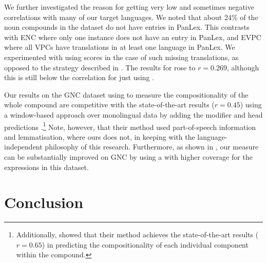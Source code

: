 \documentclass[output=paper,modfonts,nonflat]{langsci/langscibook}
\begin{document}
We further investigated the reason for getting very low and sometimes
negative correlations with many of our target languages. We noted that
about 24\% of the  noun compounds in the dataset do not have
entries in PanLex. This contrasts with ENC where only one instance
does not have an entry in PanLex, and EVPC where all VPCs have
translations in at least one language in PanLex. We experimented with
using  scores in the case of such missing
translations, as opposed to the strategy described in
. The results for \CSsvr rose to $r =
0.269$, although this is still below the correlation for just using
.

Our results on the GNC dataset using  to measure the
compositionality of the whole compound are competitive with the
state-of-the-art results ($r = 0.45$) using a window-based
 approach over monolingual  data by
adding the modifier and head predictions
\citep{SchulteImWalde+:2013}.\footnote{Additionally,
  \cite{SchulteImWalde+:2013} showed that their method achieves the
  state-of-the-art results ($r = 0.65$) in predicting the
  compositionality of each individual component within the compound.}
Note, however, that their method used part-of-speech information and
lemmatisation, where ours does not, in keeping with the
language-independent philosophy of this research. Furthermore, as
shown in , our  measure can be
substantially improved on GNC by using a  with
higher coverage for the expressions in this dataset.





\section{Conclusion}


\end{document}
